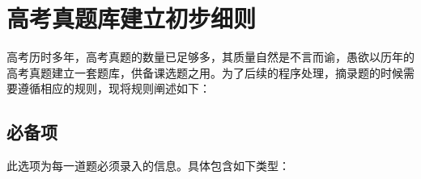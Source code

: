 \documentclass{ctexbook}
\begin{document}

\chapter{高考真题库建立初步细则}	

高考历时多年，高考真题的数量已足够多，其质量自然是不言而谕，愚欲以历年的高考真题建立一套题库，供备课选题之用。为了后续的程序处理，摘录题的时候需要遵循相应的规则，现将规则阐述如下：
\section{必备项}
此选项为每一道题必须录入的信息。具体包含如下类型：
\end{document}
